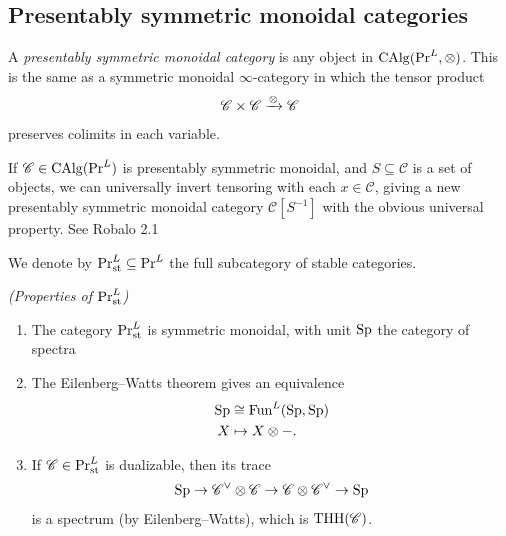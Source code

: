 \subsection{Presentably symmetric monoidal categories}



\begin{definition} A \textit{presentably symmetric monoidal category} is any object in $\mathrm{CAlg}(\mathrm{Pr}^L, \otimes)$. This is the same as a symmetric monoidal $\infty$-category in which the tensor product
\begin{align*}
    \mathscr{C} \times \mathscr{C} \xrightarrow{\otimes} \mathscr{C}
\end{align*}
preserves colimits in each variable.
\end{definition}

\begin{proposition} %
If $\mathscr{C} \in \mathrm{CAlg}(\mathrm{Pr}^L)$ is presentably symmetric monoidal, and $S \subseteq \mathscr{C}$ is a set of objects, we can universally invert tensoring with each $x\in \mathscr{C}$, giving a new presentably symmetric monoidal category $\mathscr{C}[S^{-1}]$ with the obvious universal property. See Robalo 2.1
\end{proposition}

\begin{notation} We denote by $\mathrm{Pr}_{\mathrm{st}}^L \subseteq \mathrm{Pr}^L$ the full subcategory of stable categories.
\end{notation}

\begin{proposition} \textit{(Properties of $\mathrm{Pr}^L_{\mathrm{st}}$)}
\begin{enumerate}
    \item The category $\mathrm{Pr}^L_{\mathrm{st}}$ is symmetric monoidal, with unit $\mathrm{Sp}$ the category of spectra
    \item The Eilenberg--Watts theorem gives an equivalence
    \begin{align*}
        \mathrm{Sp} &\cong \mathrm{Fun}^L(\mathrm{Sp},\mathrm{Sp}) \\
        X &\mapsto X \otimes-.
    \end{align*}
    \item If $\mathscr{C} \in \mathrm{Pr}^L_{\mathrm{st}}$ is dualizable, then its trace
    \begin{align*}
        \mathrm{Sp} \to \mathscr{C}^\vee \otimes \mathscr{C} \to \mathscr{C} \otimes \mathscr{C}^\vee \to \mathrm{Sp}
    \end{align*}
    is a spectrum (by Eilenberg--Watts), which is $\mathrm{THH}(\mathscr{C})$.
\end{enumerate}
\end{proposition}


